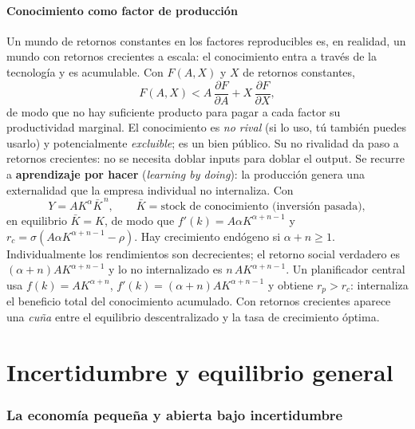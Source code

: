 \documentclass[11pt]{article}
\theoremstyle{definition}
\begin{document}
\subsection{Conocimiento como factor de producción}

Un mundo de retornos constantes en los factores reproducibles es, en realidad, un mundo con retornos
crecientes a escala: el conocimiento entra a través de la tecnología y es acumulable. Con $F(A,X)$ y
$X$ de retornos constantes,
\begin{equation}
F(A,X)<A\,\frac{\partial F}{\partial A}+X\,\frac{\partial F}{\partial X},
\end{equation}
de modo que no hay suficiente producto para pagar a cada factor su productividad marginal. El
conocimiento es \emph{no rival} (si lo uso, tú también puedes usarlo) y potencialmente \emph{excluible};
es un bien público. Su no rivalidad da paso a retornos crecientes: no se necesita doblar inputs para
doblar el output. Se recurre a \textbf{aprendizaje por hacer} (\emph{learning by doing}): la producción
genera una externalidad que la empresa individual no internaliza. Con
\begin{equation}
Y=AK^{\alpha}\bar{K}^{\,n},\qquad \bar{K}=\text{stock de conocimiento (inversión pasada)},
\end{equation}
en equilibrio $\bar{K}=K$, de modo que $f'(k)=A\alpha K^{\alpha+n-1}$ y
$r_{c}=\sigma(A\alpha K^{\alpha+n-1}-\rho)$. Hay crecimiento endógeno si $\alpha+n\ge1$.
Individualmente los rendimientos son decrecientes; el retorno social verdadero es
$(\alpha+n)AK^{\alpha+n-1}$ y lo no internalizado es $n\,AK^{\alpha+n-1}$. Un planificador central usa
$f(k)=AK^{\alpha+n}$, $f'(k)=(\alpha+n)AK^{\alpha+n-1}$ y obtiene $r_{p}>r_{c}$: internaliza el
beneficio total del conocimiento acumulado. Con retornos crecientes aparece una \emph{cuña} entre el
equilibrio descentralizado y la tasa de crecimiento óptima.

\part{Incertidumbre y equilibrio general}

\section{La economía pequeña y abierta bajo incertidumbre}
\end{document}
